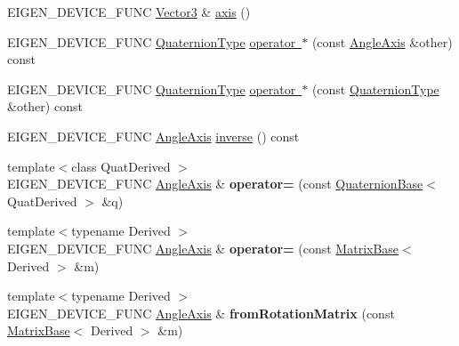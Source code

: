 \begin{DoxyCompactItemize}
\item 
E\+I\+G\+E\+N\+\_\+\+D\+E\+V\+I\+C\+E\+\_\+\+F\+U\+NC \mbox{\hyperlink{class_eigen_1_1_matrix}{Vector3}} \& \mbox{\hyperlink{class_eigen_1_1_angle_axis_afa1d16eb73d70be903a68955ffb4c324}{axis}} ()
\item 
E\+I\+G\+E\+N\+\_\+\+D\+E\+V\+I\+C\+E\+\_\+\+F\+U\+NC \mbox{\hyperlink{class_eigen_1_1_quaternion}{Quaternion\+Type}} \mbox{\hyperlink{class_eigen_1_1_angle_axis_a7eeacfc82c898c9997814abf56b12613}{operator $\ast$}} (const \mbox{\hyperlink{class_eigen_1_1_angle_axis}{Angle\+Axis}} \&other) const
\item 
E\+I\+G\+E\+N\+\_\+\+D\+E\+V\+I\+C\+E\+\_\+\+F\+U\+NC \mbox{\hyperlink{class_eigen_1_1_quaternion}{Quaternion\+Type}} \mbox{\hyperlink{class_eigen_1_1_angle_axis_a44daf2b0465ad2a69cf6c6aa40354be2}{operator $\ast$}} (const \mbox{\hyperlink{class_eigen_1_1_quaternion}{Quaternion\+Type}} \&other) const
\item 
E\+I\+G\+E\+N\+\_\+\+D\+E\+V\+I\+C\+E\+\_\+\+F\+U\+NC \mbox{\hyperlink{class_eigen_1_1_angle_axis}{Angle\+Axis}} \mbox{\hyperlink{class_eigen_1_1_angle_axis_a915c92f43b1a6103762d0d0d059748fb}{inverse}} () const
\item 
\mbox{\label{class_eigen_1_1_angle_axis_af9b630081a731290c3b14b3b71b3cce2}} 
{\footnotesize template$<$class Quat\+Derived $>$ }\\E\+I\+G\+E\+N\+\_\+\+D\+E\+V\+I\+C\+E\+\_\+\+F\+U\+NC \mbox{\hyperlink{class_eigen_1_1_angle_axis}{Angle\+Axis}} \& {\bfseries operator=} (const \mbox{\hyperlink{class_eigen_1_1_quaternion_base}{Quaternion\+Base}}$<$ Quat\+Derived $>$ \&q)
\item 
\mbox{\label{class_eigen_1_1_angle_axis_afca2ee63e1f888914099472f56eb5dd6}} 
{\footnotesize template$<$typename Derived $>$ }\\E\+I\+G\+E\+N\+\_\+\+D\+E\+V\+I\+C\+E\+\_\+\+F\+U\+NC \mbox{\hyperlink{class_eigen_1_1_angle_axis}{Angle\+Axis}} \& {\bfseries operator=} (const \mbox{\hyperlink{class_eigen_1_1_matrix_base}{Matrix\+Base}}$<$ Derived $>$ \&m)
\item 
\mbox{\label{class_eigen_1_1_angle_axis_aafb0695f29ee7f189acdf545c169f288}} 
{\footnotesize template$<$typename Derived $>$ }\\E\+I\+G\+E\+N\+\_\+\+D\+E\+V\+I\+C\+E\+\_\+\+F\+U\+NC \mbox{\hyperlink{class_eigen_1_1_angle_axis}{Angle\+Axis}} \& {\bfseries from\+Rotation\+Matrix} (const \mbox{\hyperlink{class_eigen_1_1_matrix_base}{Matrix\+Base}}$<$ Derived $>$ \&m)

\end{DoxyCompactItemize}
